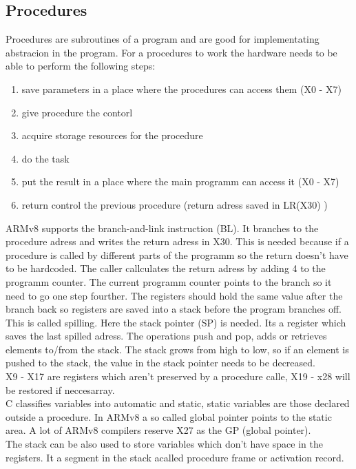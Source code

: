 \documentclass[a4paper]{scrartcl}
\begin{document}
            \subsection{Procedures}
                Procedures are subroutines of a program and are good for implementating abstracion in the program. For a procedures to work the hardware needs to be able to perform the following steps:
                \begin{enumerate}
                    \item save parameters in a place where the procedures can access them (X0 - X7)
                    \item give procedure the contorl
                    \item acquire storage resources for the procedure
                    \item do the task
                    \item put the result in a place where the main programm can access it (X0 - X7)
                    \item return control the previous procedure (return adress saved in LR(X30) ) 
                \end{enumerate}
                ARMv8 supports the branch-and-link instruction (BL). It branches to the procedure adress and writes the return adress in X30. This is needed because if a procedure
                is called by different parts of the programm so the return doesn't have to be hardcoded.%
                The caller callculates the return adress by adding 4 to the programm counter. The current programm counter points to the branch so it need to go one step fourther.
                The registers should hold the same value after the branch back so registers are saved into a stack before the program branches off. This is called spilling. 
                Here the stack pointer (SP) is needed.
                Its a register which saves the last spilled adress. The operations push and pop, adds or retrieves elements to/from the stack. The stack grows from high to low, so if an
                element is pushed to the stack, the value in the stack pointer needs to be decreased. \\
                X9 - X17 are registers which aren't preserved by a procedure calle, X19 - x28 will be restored if neccesarray.\\
                C classifies variables into automatic and static, static variables are those declared outside a procedure. In ARMv8 
                a so called global pointer points to the static area. A lot of ARMv8 compilers reserve X27 as the GP (global pointer).\\
                The stack can be also used to store variables which don't have space in the registers. It a segment in the stack acalled procedure frame or activation record.  
\end{document}
